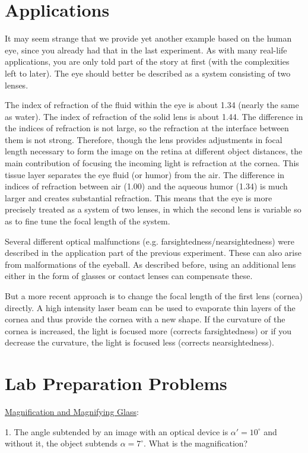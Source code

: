 \section{Applications}
It may seem strange that we provide yet another example based on the human eye, since you already had that in the last experiment. As with many real-life applications, you are only told part of the story at first (with the complexities left to later). The eye should better be described as a system consisting of two lenses.\myskip

The index of refraction of the fluid within the eye is about 1.34 (nearly the same as water). The index of refraction of the solid lens is about 1.44. The difference in the indices of refraction is not large, so the refraction at the interface between them is not strong. Therefore, though the lens provides adjustments in focal length necessary to form the image on the retina at different object distances, the main contribution of focusing the incoming light is refraction at the cornea. This tissue layer separates the eye fluid (or humor) from the air. The difference in indices of refraction between air (1.00) and the aqueous humor (1.34) is much larger and creates substantial refraction. This means that the eye is more precisely treated as a system of two lenses, in which the second lens is variable so as to fine tune the focal length of the system.\myskip

Several different optical malfunctions (e.g. farsightedness/nearsightedness) were described in the application part of the previous experiment. These can also arise from malformations of the eyeball. As described before, using an additional lens either in the form of glasses or contact lenses can compensate these. \myskip

But a more recent approach is to change the focal length of the first lens (cornea) directly. A high intensity laser beam can be used to evaporate thin layers of the cornea and thus provide the cornea with a new shape. If the curvature of the cornea is increased, the light is focused more (corrects farsightedness) or if you decrease the curvature, the light is focused less (corrects nearsightedness).

\section{Lab Preparation Problems}
\noindent\underline{Magnification and Magnifying Glass}:\myskip

1. The angle subtended by an image with an optical device is $\alpha'= 10^\circ$ and without it, the object subtends $\alpha= 7^\circ$. What is the magnification?\myskip

